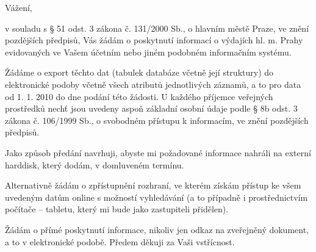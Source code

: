 \documentclass[11pt,a4paper,czech]{article}
\begin{document}

\def \yoursign { }
\def \yourdate { }
\def \oursign {ZK Pha 4/2014}
\def \place {Praha}

\printheader

\subject{Žádost zastupitele hl. m. Prahy o informace}

Vážení,

v souladu s § 51 odst. 3 zákona č. 131/2000 Sb., o hlavním městě Praze, ve znění pozdějších předpisů, Vás žádám o poskytnutí informací o výdajích hl. m. Prahy evidovaných ve Vašem účetním nebo jiném podobném informačním systému. 

Žádáme o export těchto dat (tabulek databáze včetně její struktury) do elektronické podoby včetně všech atributů jednotlivých záznamů, a to pro data od 1. 1. 2010 do dne podání této žádosti. U každého příjemce veřejných prostředků nechť jsou uvedeny aspoň základní osobní údaje podle § 8b odst. 3 zákona č. 106/1999 Sb., o svobodném přístupu k informacím, ve znění pozdějších předpisů.

Jako způsob předání navrhuji, abyste mi požadované informace nahráli na externí harddisk, který dodám, v domluveném termínu. 

Alternativně žádám o zpřístupnění rozhraní, ve kterém získám přístup ke všem uvedeným datům online s možností vyhledávání (a to případně i prostřednictvím počítače – tabletu, který mi bude jako zastupiteli přidělen).

Žádám o přímé poskytnutí informace, nikoliv jen odkaz na zveřejněný dokument, a to v elektronické podobě. Předem děkuji za Vaši vstřícnost.

\signature{Mgr. Bc. Jakub Michálek \\ předseda klubu Pirátů \\ zastupitelstvo hl. m. Prahy}

\end{document}
